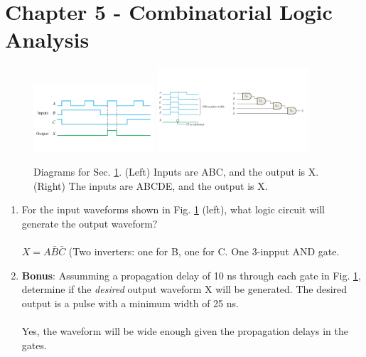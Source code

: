 \documentclass[10pt]{article}
\begin{document}
\section{Chapter 5 - Combinatorial Logic Analysis}
\label{sec:comb}
\begin{figure}[ht]
\centering
\includegraphics[width=0.4\textwidth,trim=0cm 3cm 0cm 2cm,clip=true]{timingExample7.pdf}
\includegraphics[width=0.5\textwidth,trim=0cm 4cm 0cm 2cm,clip=true]{bonus.pdf}
\caption{\label{fig:timing3} Diagrams for Sec. \ref{sec:comb}. (Left) Inputs are ABC, and the output is X. (Right) The inputs are ABCDE, and the output is X.}
\end{figure}
\begin{enumerate}
\item For the input waveforms shown in Fig. \ref{fig:timing3} (left), what logic circuit will generate the output waveform? \\ \\
$X = A\bar{B}\bar{C}$ (Two inverters: one for B, one for C.  One 3-inpput AND gate.
\item \textbf{Bonus}: Assumming a propagation delay of 10 ns through each gate in Fig. \ref{fig:timing3}, determine if the \textit{desired} output waveform X will be generated.  The desired output is a pulse with a minimum width of 25 ns. \\ \\
Yes, the waveform will be wide enough given the propagation delays in the gates.
\end{enumerate}
\end{document}
